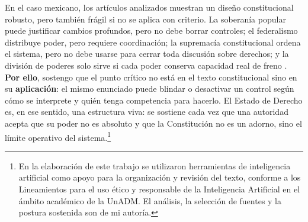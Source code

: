\documentclass[
spanish,
letterpaper, oneside
]{article}
\begin{document}
	En el caso mexicano, los artículos analizados muestran un diseño constitucional robusto, pero también frágil si no se aplica con criterio. La soberanía popular puede justificar cambios profundos, pero no debe borrar controles; el federalismo distribuye poder, pero requiere coordinación; la supremacía constitucional ordena el sistema, pero no debe usarse para cerrar toda discusión sobre derechos; y la división de poderes solo sirve si cada poder conserva capacidad real de freno \citep{cpeum2026}. \textbf{Por ello}, sostengo que el punto crítico no está en el texto constitucional sino en su \textbf{aplicación}: el mismo enunciado puede blindar o desactivar un control según cómo se interprete y quién tenga competencia para hacerlo. El Estado de Derecho es, en ese sentido, una estructura viva: se sostiene cada vez que una autoridad acepta que su poder no es absoluto y que la Constitución no es un adorno, sino el límite operativo del sistema.\footnote{En la elaboración de este trabajo se utilizaron herramientas de inteligencia artificial como apoyo para la organización y revisión del texto, conforme a los Lineamientos para el uso ético y responsable de la Inteligencia Artificial en el ámbito académico de la UnADM. El análisis, la selección de fuentes y la postura sostenida son de mi autoría.}


	
\end{document}
